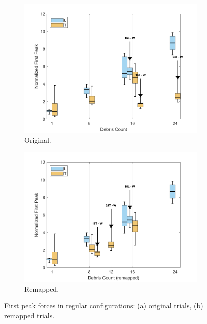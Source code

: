 \documentclass{article}
\begin{document}
\begin{figure}[htbp]
    \centering
    \begin{subfigure}[t]{0.48\textwidth}
        \centering
        \includegraphics[width=\textwidth]{FirstPeak_Regular_SplitByTrial.png}
        \caption{Original.}
        \label{fig:firstpeak_regular_original}
    \end{subfigure}
    \hfill
    \begin{subfigure}[t]{0.48\textwidth}
        \centering
        \includegraphics[width=\textwidth]{FirstPeak_Regular_RemappedT.png}
        \caption{Remapped.}
        \label{fig:firstpeak_regular_remap}
    \end{subfigure}
    \caption{First peak forces in regular configurations: (a) original trials, (b) remapped trials.}
    \label{fig:firstpeak_regular_split}
\end{figure}
\end{document}
